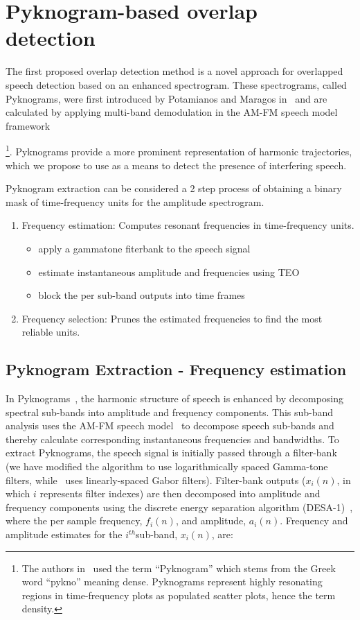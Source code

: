 \section{Pyknogram-based overlap detection}
\label{sec:ch2_Pykno}
The first proposed overlap detection method is a novel approach for overlapped speech detection based on an enhanced spectrogram. 
These spectrograms, called Pyknograms, were first introduced by Potamianos and Maragos in~\cite{potamianos_maragos_icassp95,potamianos_maragos_jasa96} and are calculated by applying multi-band demodulation in the AM-FM speech model framework~\cite{maragos_kaiser_quatieri}{\footnote{The authors in~\cite{potamianos_maragos_jasa96} used the term ``Pyknogram'' which stems from the Greek word ``pykno'' meaning dense. Pyknograms represent highly resonating regions in time-frequency plots as populated scatter plots, hence the term density.}. 
Pyknograms provide a more prominent representation of harmonic trajectories, which we propose to use as a means to detect the presence of interfering speech.

Pyknogram extraction can be considered a 2 step process of obtaining a binary mask of time-frequency units for the amplitude spectrogram. 
\begin{enumerate}
	\item Frequency estimation: Computes resonant frequencies in time-frequency units.  
	\begin{itemize}
		\item apply a gammatone fiterbank to the speech signal
		\item estimate instantaneous amplitude and frequencies using TEO
		\item block the per sub-band outputs into time frames
	\end{itemize}
	\item Frequency selection: Prunes the estimated frequencies to find the most reliable units.
\end{enumerate}

\subsection{Pyknogram Extraction - Frequency estimation}
\label{ssec:pykno_estimate}
In Pyknograms~\cite{potamianos_maragos_jasa96}, the harmonic structure of speech is enhanced by decomposing spectral sub-bands into amplitude and frequency components. 
This sub-band analysis uses the AM-FM speech model~\cite{maragos_kaiser_quatieri} to decompose speech sub-bands and thereby calculate corresponding instantaneous frequencies and bandwidths. 
To extract Pyknograms, the speech signal is initially passed through a filter-bank (we have modified the algorithm to use logarithmically spaced Gamma-tone filters, while~\cite{potamianos_maragos_jasa96} uses linearly-spaced Gabor filters). 
Filter-bank outputs ($x_i(n)$, in which $i$ represents filter indexes) are then decomposed into amplitude and frequency components using the discrete energy separation algorithm (DESA-1)~\cite{maragos_kaiser_quatieri}, where the per sample frequency, $f_i(n)$, and amplitude, $a_i(n)$. Frequency and amplitude estimates for the $i^{th} $sub-band, $x_i(n)$, are:

}
